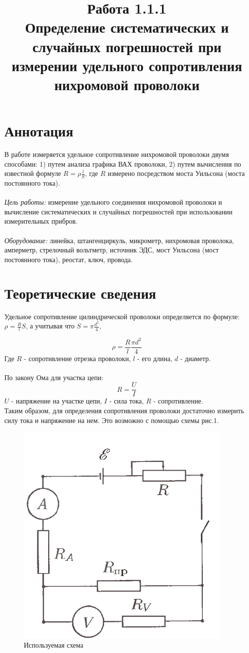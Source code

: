 \documentclass{article}
\title{Работа 1.1.1\\ 
	Определение систематических и случайных погрешностей при измерении удельного сопротивления нихромовой проволоки}
\begin{document}
	
	\maketitle
	
	\section{Аннотация}
	В работе измеряется удельное сопротивление нихромовой проволоки двумя способами: 1) путем анализа графика ВАХ проволоки, 2) путем вычисления по известной формуле \(R = \rho \frac{l}{S}\), где \( R\) измерено  посредством моста Уильсона (моста постоянного тока).\\\\
	\emph{Цель работы:} измерение удельного соединения нихромовой проволоки и вычисление систематических и случайных погрешностей при использовании измерительных прибров. \\\\
	\emph{Оборудование:} линейка, штангенциркуль, микрометр, нихромовая проволока, амперметр, стрелочный вольтметр, источник ЭДС, мост Уильсона (мост постоянного тока), реостат, ключ, провода.
	
	\section{Теоретические сведения}
	
	Удельное сопротивление цилиндрической проволоки определяется по формуле:
	$ \rho = \frac{R}{l}S $, а учитывая что $ S = {\pi}{\frac{d^2}{4}} $,
	
	$$ \rho = \frac{R}{l}{\frac{{\pi}d^2}{4}} $$
	Где $ R $ - сопротивление отрезка проволоки, $ l $ - его длина, $ d $ - диаметр.\\\\
	По закону Ома для участка цепи: 
	$$ R = \frac{U}{I} $$
	$ U $ - напряжение на участке цепи, $ I $ - сила тока, $ R $ - сопротивление.\\
	
	Таким образом, для определения сопротивления проволоки достаточно измерить силу тока и напряжение на нем. Это возможно с помощью схемы рис.1.\\
	\begin{figure}
		\centering
		\includegraphics[width = 0.5\linewidth]{1.png}
		\caption{Используемая схема}
		\label{fig:enter-label}
	\end{figure}
	
\end{document}
